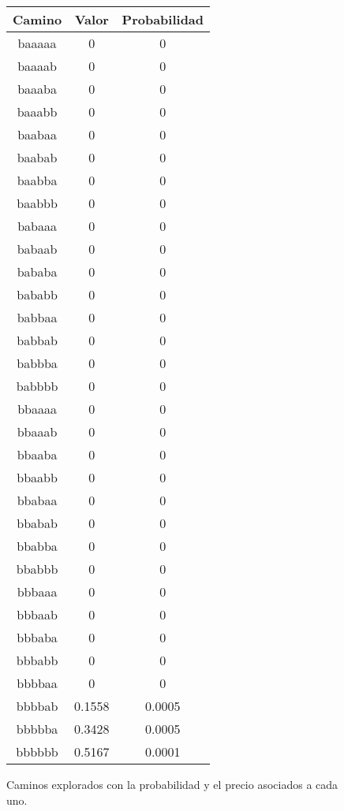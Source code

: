 \begin{figure}[hbpt]
\begin{minipage}{0.48\textwidth}
\begin{center}
\begin{tabular}{|c|c|c|}
\hline
\textbf{Camino} & \textbf{Valor} & \textbf{Probabilidad} \\
\hline
baaaaa  & 0 & 0 \\
baaaab  & 0 & 0 \\
baaaba  & 0 & 0 \\
baaabb  & 0 & 0 \\
baabaa  & 0 & 0 \\
baabab  & 0 & 0 \\
baabba  & 0 & 0 \\
baabbb  & 0 & 0 \\
babaaa  & 0 & 0 \\
babaab  & 0 & 0 \\
bababa  & 0 & 0 \\
bababb  & 0 & 0 \\
babbaa  & 0 & 0 \\
babbab  & 0 & 0 \\
babbba  & 0 & 0 \\
babbbb  & 0 & 0 \\
bbaaaa  & 0 & 0 \\
bbaaab  & 0 & 0 \\
bbaaba  & 0 & 0 \\
bbaabb  & 0 & 0 \\
bbabaa  & 0 & 0 \\
bbabab  & 0 & 0 \\
bbabba  & 0 & 0 \\
bbabbb  & 0 & 0 \\
bbbaaa  & 0 & 0 \\
bbbaab  & 0 & 0 \\
bbbaba  & 0 & 0 \\
bbbabb  & 0 & 0 \\
bbbbaa  & 0 & 0 \\
bbbbab  &  0.1558  &  0.0005  \\
bbbbba  &  0.3428  &  0.0005  \\
bbbbbb  &  0.5167  &  0.0001  \\
\hline
\end{tabular}
\end{center}
\end{minipage}
\caption{Caminos explorados con la probabilidad y el precio asociados a cada uno.}
\label{fig:2_3c}
\end{figure}

